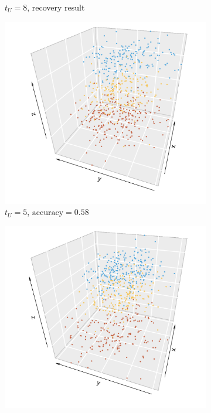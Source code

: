 \documentclass[10pt,journal,compsoc]{IEEEtran}
\numberwithin{equation}{section}
\begin{document}
\begin{figure}[htbp]
\begin{subfigure}{.49\columnwidth}
\caption{$t_U = 8$, recovery result}
\end{subfigure}
\par
\centering
\begin{subfigure}{.49\columnwidth}
\includegraphics[width=\columnwidth]{real_5.png}%
\caption{$t_U = 5$, $\text{accuracy} = 0.58$}
\end{subfigure}
\begin{subfigure}{.49\columnwidth}
\includegraphics[width=\columnwidth]{real_6.png}%

\end{subfigure}
\end{figure}
\end{document}

